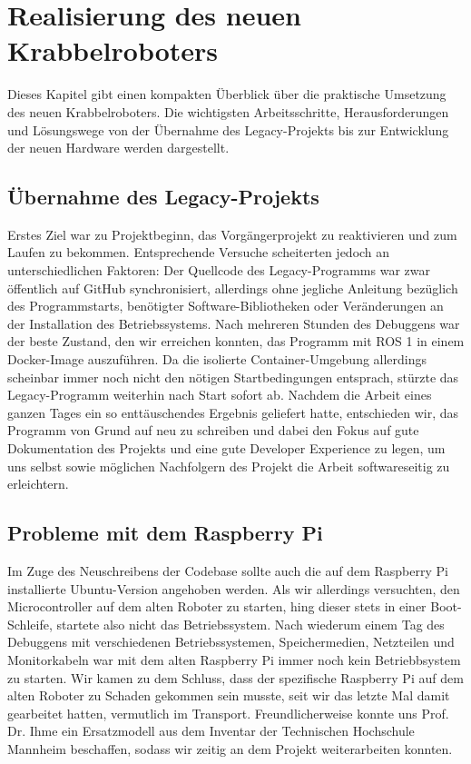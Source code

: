 \section{Realisierung des neuen Krabbelroboters}
\label{sec:realisierung}

Dieses Kapitel gibt einen kompakten Überblick über die praktische Umsetzung des neuen Krabbelroboters. Die wichtigsten Arbeitsschritte, Herausforderungen und Lösungswege von der Übernahme des Legacy-Projekts bis zur Entwicklung der neuen Hardware werden dargestellt.

\subsection{Übernahme des Legacy-Projekts}

Erstes Ziel war zu Projektbeginn, das Vorgängerprojekt zu reaktivieren und zum Laufen zu bekommen. Entsprechende Versuche scheiterten jedoch an unterschiedlichen Faktoren: Der Quellcode des Legacy-Programms war zwar öffentlich auf GitHub synchronisiert, allerdings ohne jegliche Anleitung bezüglich des Programmstarts, benötigter Software-Bibliotheken oder Veränderungen an der Installation des Betriebssystems. Nach mehreren Stunden des Debuggens war der beste Zustand, den wir erreichen konnten, das Programm mit ROS 1 in einem Docker-Image auszuführen. Da die isolierte Container-Umgebung allerdings scheinbar immer noch nicht den nötigen Startbedingungen entsprach, stürzte das Legacy-Programm weiterhin nach Start sofort ab. Nachdem die Arbeit eines ganzen Tages ein so enttäuschendes Ergebnis geliefert hatte, entschieden wir, das Programm von Grund auf neu zu schreiben und dabei den Fokus auf gute Dokumentation des Projekts und eine gute Developer Experience zu legen, um uns selbst sowie möglichen Nachfolgern des Projekt die Arbeit softwareseitig zu erleichtern.

\subsection{Probleme mit dem Raspberry Pi}

Im Zuge des Neuschreibens der Codebase sollte auch die auf dem Raspberry Pi installierte Ubuntu-Version angehoben werden. Als wir allerdings versuchten, den Microcontroller auf dem alten Roboter zu starten, hing dieser stets in einer Boot-Schleife, startete also nicht das Betriebssystem. Nach wiederum einem Tag des Debuggens mit verschiedenen Betriebssystemen, Speichermedien, Netzteilen und Monitorkabeln war mit dem alten Raspberry Pi immer noch kein Betriebbsystem zu starten. Wir kamen zu dem Schluss, dass der spezifische Raspberry Pi auf dem alten Roboter zu Schaden gekommen sein musste, seit wir das letzte Mal damit gearbeitet hatten, vermutlich im Transport. Freundlicherweise konnte uns Prof. Dr. Ihme ein Ersatzmodell aus dem Inventar der Technischen Hochschule Mannheim beschaffen, sodass wir zeitig an dem Projekt weiterarbeiten konnten.


